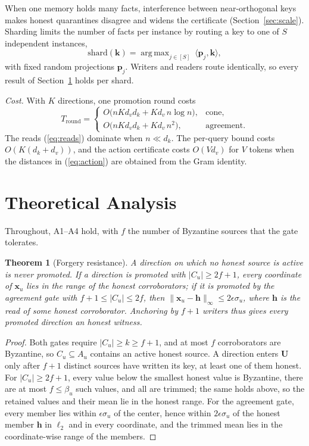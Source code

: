 \documentclass[journal]{IEEEtran}
\newtheorem{theorem}{Theorem}
\theoremstyle{remark}
\DeclareMathOperator*{\argmax}{arg\,max}
\begin{document}
When one memory holds many facts, interference between near-orthogonal keys makes honest quarantines disagree and widens the certificate (Section~\ref{sec:scale}). Sharding limits the number of facts per instance by routing a key to one of $S$ independent instances,
\begin{equation}\label{eq:shard}
\mathrm{shard}(\bm{k})=\argmax_{j\in[S]}\ \langle\bm{p}_j,\bm{k}\rangle,
\end{equation}
with fixed random projections $\bm{p}_j$. Writers and readers route identically, so every result of Section~\ref{sec:theory} holds per shard.

\emph{Cost.} With $K$ directions, one promotion round costs
\begin{equation}\label{eq:cost}
T_{\mathrm{round}}=\begin{cases}O\big(nKd_vd_k+Kd_v\,n\log n\big), & \text{cone},\\
O\big(nKd_vd_k+Kd_v\,n^2\big), & \text{agreement}.\end{cases}
\end{equation}
The reads (\ref{eq:reads}) dominate when $n\ll d_k$. The per-query bound costs $O(K(d_k+d_v))$, and the action certificate costs $O(Vd_v)$ for $V$ tokens when the distances in (\ref{eq:action}) are obtained from the Gram identity.

\section{Theoretical Analysis}\label{sec:theory}
Throughout, A1--A4 hold, with $f$ the number of Byzantine sources that the gate tolerates.

\begin{theorem}[Forgery resistance]\label{thm:forge}
A direction on which no honest source is active is never promoted. If a direction is promoted with $|C_u|\ge 2f+1$, every coordinate of $\bm{x}_u$ lies in the range of the honest corroborators; if it is promoted by the agreement gate with $f+1\le|C_u|\le 2f$, then $\|\bm{x}_u-\bm{h}\|_\infty\le 2\epsilon\sigma_u$, where $\bm{h}$ is the read of some honest corroborator. Anchoring by $f+1$ writers thus gives every promoted direction an honest witness.
\end{theorem}
\begin{proof}
Both gates require $|C_u|\ge k\ge f+1$, and at most $f$ corroborators are Byzantine, so $C_u\subseteq A_u$ contains an active honest source. A direction enters $\bm{U}$ only after $f+1$ distinct sources have written its key, at least one of them honest. For $|C_u|\ge 2f+1$, every value below the smallest honest value is Byzantine, there are at most $f\le\beta_u$ such values, and all are trimmed; the same holds above, so the retained values and their mean lie in the honest range. For the agreement gate, every member lies within $\epsilon\sigma_u$ of the center, hence within $2\epsilon\sigma_u$ of the honest member $\bm{h}$ in $\ell_2$ and in every coordinate, and the trimmed mean lies in the coordinate-wise range of the members.
\end{proof}
\end{document}
